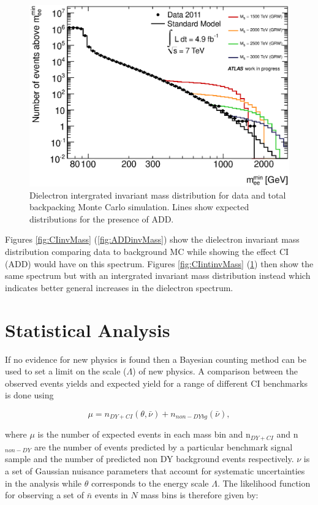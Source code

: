 \begin{figure}[h!p]
\centering
\includegraphics[width=0.7\linewidth]{images/ADD_int_inv_mass.eps}
\caption{Dielectron intergrated invariant mass distribution for data and total backpacking Monte Carlo simulation. Lines show expected distributions for the presence of ADD.}
\label{fig:ADDintinvMass}
\end{figure}


Figures \ref{fig:CIinvMass} (\ref{fig:ADDinvMass}) show the dielectron invariant mass distribution comparing data to background MC while showing the effect CI (ADD) would have on this spectrum. Figures \ref{fig:CIintinvMass} (\ref{fig:ADDintinvMass}) then show the same spectrum but with an intergrated invariant mass distribution instead which indicates better general increases in the dielectron spectrum.











\section{Statistical Analysis}
If no evidence for new physics is found then a Bayesian counting method can be used to set a limit on the scale ($\Lambda$) of new physics. A comparison between the observed events yields and expected yield for a range of different CI benchmarks is done using 

\begin{equation}
        \mu = n_{DY+CI}(\theta,\bar{\nu}) + n_{non-DY bg}(\bar{\nu}),
\end{equation}

where $\mu$ is the number of expected events in each mass bin and n$_{DY+CI}$ and n$_{non-DY}$ are the number of events predicted by a particular benchmark signal sample and the number of predicted non DY background events respectively. $\nu$ is a set of Gaussian nuisance parameters that account for systematic uncertainties in the analysis while $\theta$ corresponds to the energy scale $\Lambda$.
The likelihood function for observing a set of $\bar{n}$ events in $N$ mass bins is therefore given by: 

